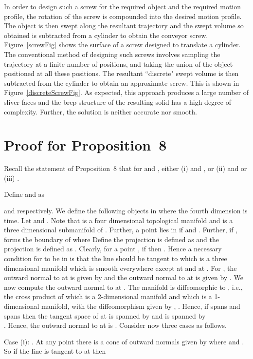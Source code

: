 \documentclass{elsart5p}
\newcommand{\eat}[1]{}
\begin{document}
In order to design such a screw for the required object and the required motion profile, 
the rotation of the screw is compounded into the desired motion profile.  The object is then 
swept along the resultant trajectory and the swept volume so obtained is subtracted from a cylinder to 
obtain the conveyor screw.  Figure~\ref{screwFig} shows the surface of a screw designed 
to translate a cylinder.  The conventional method of designing such screws involves sampling 
the trajectory at a finite number of positions, and taking the union of the object positioned at all these 
positions.  The resultant ``discrete" swept volume is then subtracted from the cylinder to obtain 
an approximate screw.  This is shown in Figure~\ref{discreteScrewFig}.  As expected, this approach 
produces a large number of sliver faces and the brep structure of the resulting solid has a high degree 
of complexity.  Further, the solution is neither accurate nor smooth.


\section{Proof for Proposition~8}	\label{gProofSec}
Recall the statement of Proposition~8 that for  and , 
either (i)  and , or 
(ii)  and  or (iii) .


Define  and  as 
\eat{  and }
  and  
 respectively.
We define the following objects in  where the fourth dimension is time.
Let  and
.
Note that  is a four dimensional topological manifold and  is a three dimensional
submanifold of . Further, a point  lies in  if  and .  
Further, if ,  
forms the boundary of  where Define the 
projection  is defined as  and 
the projection  is defined as .
Clearly, for a point 
, if  then .  Hence a necessary 
condition for  to be in  is that the line  should be tangent to 
which is a three dimensional manifold which is smooth everywhere except at 
 and at . 
For , \eat{  is spanned by .  Hence }
the outward normal to  at  is given by  and  
the outward normal to  at  is given by .
We now compute the outward normal to  at .
The manifold  is diffeomorphic to , i.e., the cross product of  
which is a 2-dimensional manifold and  which is a 1-dimensional manifold, with the 
diffeomorphism given by , .  
Hence, if  spans   and  spans  
then the tangent space of  at  is spanned by 
 and  is spanned by \\
 .
Hence, the outward normal to  at  is 
.
Consider now three cases as follows.

Case (i): .  At any point  there is a cone of outward normals 
given by  
where  and .  So if the line  is tangent to  at  then 
\end{document}
